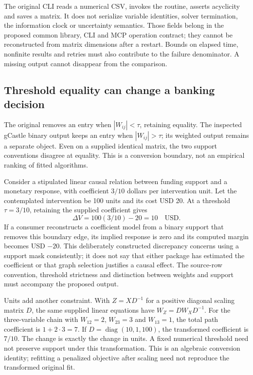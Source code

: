 The original CLI reads a numerical CSV, invokes the routine, asserts
acyclicity and saves a matrix. It does not serialize variable identities,
solver termination, the information clock or uncertainty semantics. Those
fields belong in the proposed common library, CLI and MCP operation contract;
they cannot be reconstructed from matrix dimensions after a restart. Bounds on
elapsed time, nonfinite results and retries must also contribute to the failure
denominator. A missing output cannot disappear from the comparison.
\citep{exec23_notears_source}

\subsection{Threshold equality can change a banking decision}
\label{exec23:notears-threshold}
The original removes an entry when $|W_{ij}|<\tau$, retaining equality.
The inspected gCastle binary output keeps an entry when $|W_{ij}|>\tau$;
its weighted output remains a separate object. Even on a supplied identical
matrix, the two support conventions disagree at equality. This is a conversion
boundary, not an empirical ranking of fitted algorithms.
\citep{exec23_notears_source,exec20_gcastle_source}

Consider a stipulated linear causal relation between funding support and a
monetary response, with coefficient $3/10$ dollars per intervention unit.
Let the contemplated intervention be 100 units and its cost USD 20.
At a threshold $\tau=3/10$, retaining the supplied coefficient gives
\begin{equation}
 \Delta V=100(3/10)-20=10\quad\text{USD}.
 \label{exec23:notears-value}
\end{equation}
If a consumer reconstructs a coefficient model from a binary support that
removes this boundary edge, its implied response is zero and its computed
margin becomes USD $-20$. This deliberately constructed discrepancy concerns
using a support mask consistently; it does not say that either package has
estimated the coefficient or that graph selection justifies a causal effect.
The source-row convention, threshold strictness and distinction between
weights and support must accompany the proposed output.
\citep{exec23_notears_reference}

Units add another constraint. With $Z=XD^{-1}$ for a positive diagonal scaling
matrix $D$, the same supplied linear equations have $W_Z=DW_XD^{-1}$.
For the three-variable chain with $W_{12}=2$, $W_{23}=3$ and $W_{13}=1$,
the total path coefficient is $1+2\cdot3=7$.
If $D=\operatorname{diag}(10,1,100)$, the transformed coefficient is $7/10$.
The change is exactly the change in units. A fixed numerical threshold need
not preserve support under this transformation. This is an algebraic conversion
identity; refitting a penalized objective after scaling need not reproduce
the transformed original fit.~\citep{exec23_notears_reference}

